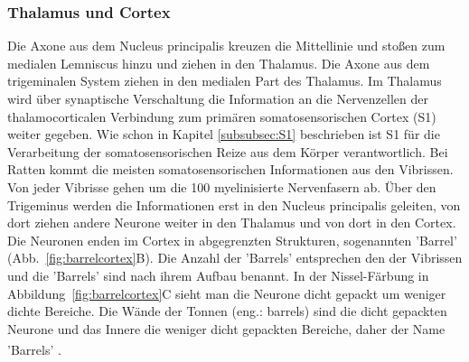 \documentclass[12pt,a4paper,pdftex]{article}
\begin{document}
\subsubsection*{Thalamus und Cortex}
Die Axone aus dem Nucleus principalis kreuzen die Mittellinie und stoßen zum medialen Lemniscus hinzu und ziehen in den Thalamus. Die Axone aus dem trigeminalen System ziehen in den medialen Part des Thalamus. Im Thalamus wird über synaptische Verschaltung die Information an die Nervenzellen der thalamocorticalen Verbindung zum primären somatosensorischen Cortex (S1) weiter gegeben. 
Wie schon in Kapitel \ref{subsubsec:S1} beschrieben ist S1 für die Verarbeitung der somatosensorischen Reize aus dem Körper verantwortlich. Bei Ratten kommt die meisten somatosensorischen Informationen aus den Vibrissen. Von jeder Vibrisse gehen um die 100 myelinisierte Nervenfasern ab. Über den Trigeminus werden die Informationen erst in den Nucleus principalis geleiten, von dort ziehen andere Neurone weiter in den Thalamus und von dort in den Cortex. Die Neuronen enden im Cortex   in abgegrenzten Strukturen, sogenannten 'Barrel' (Abb.~\ref{fig:barrelcortex}B). Die Anzahl der 'Barrels' entsprechen den der Vibrissen und die 'Barrels' sind nach ihrem Aufbau benannt. In der Nissel-Färbung in Abbildung~\ref{fig:barrelcortex}C sieht man die Neurone dicht gepackt um weniger dichte Bereiche. Die Wände der Tonnen (eng.: barrels) sind die dicht gepackten Neurone und das Innere die weniger dicht gepackten Bereiche, daher der Name 'Barrels' \textsuperscript{\cite[8]{smith2008biology}}. 
\end{document}
